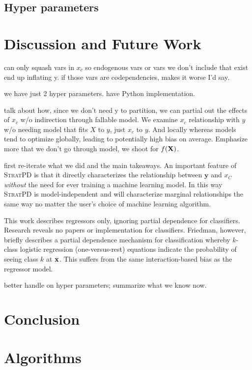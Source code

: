 \documentclass[12pt]{article}
\newcommand{\spd}{\fontfamily{cmr}\textsc{\small StratPD}}
\newcommand{\xnc}{$x_{\overline{c}}$}
\begin{document}
\subsection{Hyper parameters}

\section{Discussion and Future Work}

can only squash vars in \xnc{} so endogenous vars or vars we don't include that exist end up inflating y. if those vars are codependencies, makes it worse I'd say.

we have just 2 hyper parameters. have Python implementation.

talk about how, since we don't need y to partition, we can partial out the effects of \xnc{} w/o indirection through fallable model.  We examine $x_c$ relationship with $y$ w/o needing model that fits $X$ to $y$, just $x_c$ to $y$. And locally whereas models tend to optimize globally, leading to potentially high bias on average. Emphasize more that we don't go through model, we shoot for $f(\bf X)$.

{\color{red} first re-iterate what we did and the main takeaways}. An important feature of \spd{} is that it directly characterizes the relationship between $\mathbf{y}$ and $x_C$ \emph{without} the need for ever training a machine learning model. In this way \spd{} is {model-independent} and will characterize marginal relationships the same way no matter the user's choice of machine learning algorithm. 

This work describes regressors only, ignoring partial dependence for classifiers.  Research reveals no papers or implementation for classifiers. Friedman, however, briefly describes a partial dependence mechanism for classification whereby $k$-class logistic regression (one-versus-rest) equations indicate the probability of seeing class $k$ at $\bf{x}$.  This suffers from the same interaction-based bias as the regressor model.

better handle on hyper parameters; summarize what we know now.

\section{Conclusion}
\label{sec:conc}

\section{Algorithms}
\end{document}
